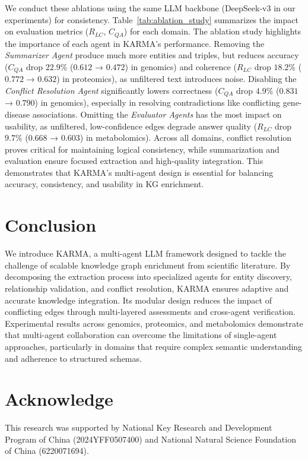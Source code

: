 \documentclass{article}
\begin{document}
We conduct these ablations using the same LLM backbone (DeepSeek-v3 in our experiments) for consistency. Table~\ref{tab:ablation_study} summarizes the impact on evaluation metrics ($R_{LC}$, $C_{QA}$) for each domain. The ablation study highlights the importance of each agent in KARMA’s performance. Removing the \emph{Summarizer Agent} produce much more entities and triples, but reduces accuracy ($C_{QA}$ drop $22.9\%$ ($0.612$ → $0.472$) in genomics) and coherence ($R_{LC}$ drop $18.2\%$ ($0.772$ → $0.632$) in proteomics), as unfiltered text introduces noise. Disabling the \emph{Conflict Resolution Agent} significantly lowers correctness ($C_{QA}$ drop $4.9\%$ ($0.831$ → $0.790$) in genomics), especially in resolving contradictions like conflicting gene-disease associations. Omitting the \emph{Evaluator Agents} has the most impact on usability, as unfiltered, low-confidence edges degrade answer quality ($R_{LC}$ drop $9.7\%$ ($0.668$ → $0.603$) in metabolomics). Across all domains, conflict resolution proves critical for maintaining logical consistency, while summarization and evaluation ensure focused extraction and high-quality integration. This demonstrates that KARMA’s multi-agent design is essential for balancing accuracy, consistency, and usability in KG enrichment.

\section{Conclusion}
We introduce KARMA, a multi-agent LLM framework designed to tackle the challenge of scalable knowledge graph enrichment from scientific literature. By decomposing the extraction process into specialized agents for entity discovery, relationship validation, and conflict resolution, KARMA ensures adaptive and accurate knowledge integration. Its modular design reduces the impact of conflicting edges through multi-layered assessments and cross-agent verification. Experimental results across genomics, proteomics, and metabolomics demonstrate that multi-agent collaboration can overcome the limitations of single-agent approaches, particularly in domains that require complex semantic understanding and adherence to structured schemas.

\section*{Acknowledge}
This research was supported by National Key Research and Development Program of China
(2024YFF0507400) and National Natural Science Foundation of China (6220071694).
\end{document}

